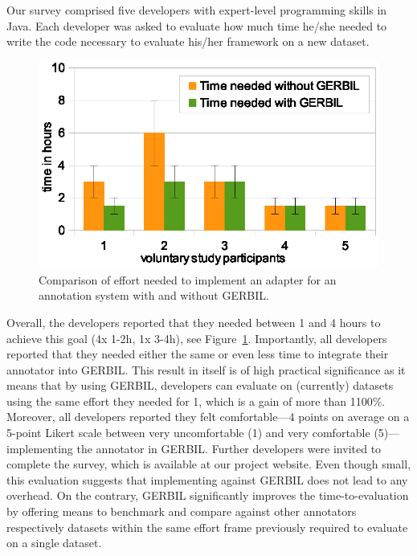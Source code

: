 Our survey comprised five developers with expert-level programming skills in Java. Each developer was asked to evaluate how much time he/she needed to write the code necessary to evaluate his/her framework on a new dataset.

\begin{figure}[htb!]
\centering
\includegraphics[width=\columnwidth]{part_02/benchmarking/WWW_GERBIL/user_study.eps}
\caption{Comparison of effort needed to implement an adapter for an annotation system with and without GERBIL.}
\label{ref:comparedTime}
\end{figure}
%

Overall, the developers reported that they needed between 1 and 4 hours to achieve this goal (4x 1-2h, 1x 3-4h), see Figure~\ref{ref:comparedTime}.
Importantly, all developers reported that they needed either the same or even less time to integrate their annotator into GERBIL.
This result in itself is of high practical significance as it means that by using GERBIL, developers can evaluate on (currently) \overalldatasets datasets using the same effort they needed for 1, which is a gain of more than 1100\%.
Moreover, all developers reported they felt comfortable---4 points on average on a 5-point Likert scale between very uncomfortable (1) and very comfortable (5)---implementing the annotator in GERBIL.
Further developers were invited to complete the survey, which is available at our project website.
Even though small, this evaluation suggests that implementing against GERBIL does not lead to any overhead. On the contrary, GERBIL significantly improves the time-to-evaluation by offering means to benchmark and compare against other annotators respectively datasets within the same effort frame previously required to evaluate on a single dataset.

